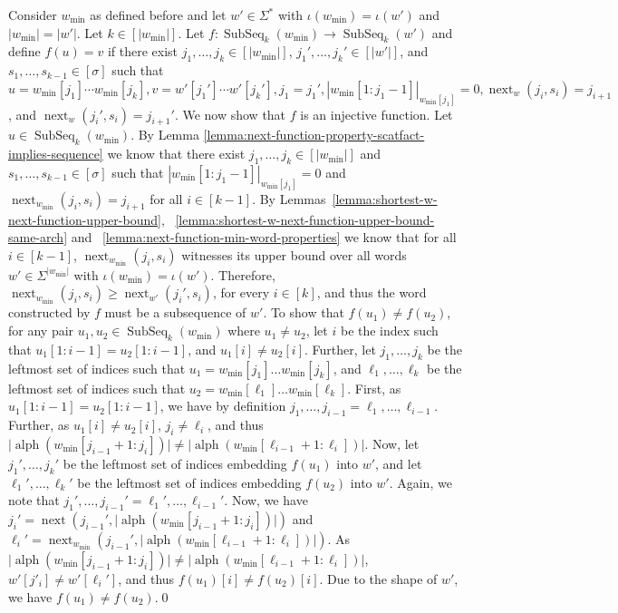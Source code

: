 \documentclass[10pt,a4paper]{amsart}
\makeatletter
\DeclareMathOperator{\alphabet}{alph}
\DeclareMathOperator\ScatFact{SubSeq}
\DeclareMathOperator{\nextAlphPos}{next}
\theoremstyle{plain}
\theoremstyle{definition}
\renewenvironment{proof}[1][\proofname]{\par
  \pushQED{}%
  \normalfont \topsep6\p@\@plus6\p@\relax
  \trivlist
  \item[\hskip\labelsep\itshape #1\@addpunct{.}]\ignorespaces
}{%
  \popQED\endtrivlist\@endpefalse
}
\makeatother
\begin{document}
\begin{proof}
	Consider $w_{\min}$ as defined before and let $w'\in\Sigma^*$ with $\iota(w_{\min}) = \iota(w')$
	and $|w_{\min}| = |w'|$. Let $k\in[|w_{\min}|]$.
	Let $f : \ScatFact_k(w_{\min}) \rightarrow \ScatFact_k(w')$ and define $f(u) = v$
	if there exist $j_1,\ldots,j_k\in[|w_{\min}|]$, $j_1',\ldots,j_k'\in[|w'|]$, and $s_1,\ldots,s_{k-1}\in[\sigma]$ such that $u = w_{\min}[j_1]\cdots w_{\min}[j_k], v = w'[j_1'] \cdots w'[j_k'], j_1 = j_1',|w_{\min}[1:j_1-1]|_{w_{\min}[j_1]} = 0, \nextAlphPos_w(j_i,s_i) = j_{i+1}$, and $\nextAlphPos_w(j_i',s_i) = j_{i+1}'$.
	We now show that $f$ is an injective function.
	Let $u\in\ScatFact_k(w_{\min})$.
	By Lemma \ref{lemma:next-function-property-scatfact-implies-sequence} we know that there exist $j_1,\ldots,j_k\in[|w_{\min}|]$ and
	$s_1,\ldots,s_{k-1}\in[\sigma]$ such that $|w_{\min}[1:j_1-1]|_{w_{\min}[j_1]} = 0$ and $\nextAlphPos_{w_{\min}}(j_i,s_i) = j_{i+1}$
	for all $i\in[k-1]$.
	By Lemmas~\ref{lemma:shortest-w-next-function-upper-bound}, ~\ref{lemma:shortest-w-next-function-upper-bound-same-arch}
	and ~\ref{lemma:next-function-min-word-properties} we know that for all $i\in[k-1]$, $\nextAlphPos_{w_{\min}}(j_i,s_i)$
	witnesses its upper bound over all words $w'\in\Sigma^{\vert w_{\min} \vert}$ with $\iota(w_{\min}) = \iota(w')$. Therefore, $\nextAlphPos_{w_{\min}}(j_i,s_i) \geq \nextAlphPos_{w'}(j_i',s_i)$, for every $i \in [k]$, and thus the word constructed by $f$ must be a subsequence of $w'$. To show that $f(u_1) \neq f(u_2)$, for any pair $u_1, u_2 \in \ScatFact_k(w_{\min})$ where $u_1 \neq u_2$, let $i$ be the index such that $u_1[1: i - 1] = u_2[1 : i - 1]$, and $u_1[i] \neq u_2[i]$. Further, let $j_1, \dots, j_k$ be the leftmost set of indices such that $u_1 = w_{\min}[j_1] \dots w_{\min}[j_k]$, and $\ell_1, \dots, \ell_k$ be the leftmost set of indices such that $u_2 = w_{\min}[\ell_1] \dots w_{\min}[\ell_k]$. First, as $u_1[1:i - 1] = u_2[1:i - 1]$, we have by definition $j_1, \dots, j_{i - 1} = \ell_1, \dots, \ell_{i - 1}$. Further, as $u_1[i] \neq u_2[i]$, $j_i \neq \ell_i$, and thus $\vert \alphabet(w_{\min}[j_{i - 1} + 1 : j_{i}]) \vert \neq \vert \alphabet(w_{\min}[\ell_{i - 1} + 1 : \ell_i]) \vert$. Now, let $j_1', \dots, j_k'$ be the leftmost set of indices embedding $f(u_1)$ into $w'$, and let $\ell_1', \dots, \ell_k'$ be the leftmost set of indices embedding $f(u_2)$ into $w'$. Again, we note that $j_1', \dots, j_{i - 1}' = \ell_1', \dots, \ell_{i - 1}'$. Now, we have $j_i' = \nextAlphPos(j_{i - 1}', \vert \alphabet(w_{\min}[j_{i - 1} + 1 : j_{i}]) \vert)$ and $\ell_i' =  \nextAlphPos_{w_{\min}}(j_{i - 1}', \vert \alphabet(w_{\min}[\ell_{i - 1} + 1 : \ell_i]) \vert)$. As $\vert \alphabet(w_{\min}[j_{i - 1} + 1 : j_{i}]) \vert \neq \vert \alphabet(w_{\min}[\ell_{i - 1} + 1 : \ell_i]) \vert$, $w'[j'_i] \neq w'[\ell_i']$, and thus $f(u_1)[i] \neq f(u_2)[i]$. Due to the shape of $w'$, we have $f(u_1) \neq f(u_2)$.\qed

\end{proof}
\end{document}
